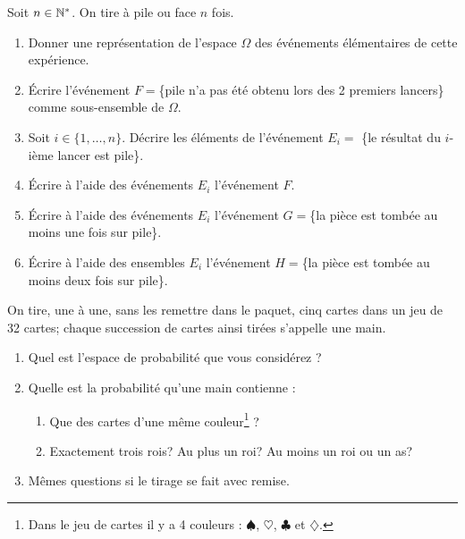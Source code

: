 \documentclass[a4paper,12pt,reqno]{amsart}
\begin{document}
\begin{exo}

    Soit $n\in \mathbb{N}^*$. On tire à pile ou face $n$ fois.

    \begin{enumerate}
      \item Donner une représentation  de l'espace $\Omega$ des événements
      élémentaires de cette expérience.

      \item Écrire l'événement $F=$\{pile n'a pas été obtenu lors
      des 2 premiers lancers\} comme sous-ensemble de $\Omega$.

      \item Soit $i\in \{1,\ldots,n\}$.
      Décrire les éléments de l'événement $E_i=$
      \{le résultat du $i$-ième lancer est pile\}.

      \item Écrire à l'aide des événements $E_i$ l'événement $F$.

      \item Écrire à l'aide des événements $E_i$ l'événement
      $G=$\{la pièce est tombée au moins une fois sur pile\}.

      \item Écrire à l'aide des ensembles $E_i$ l'événement
      $H=$\{la pièce est tombée au moins deux fois sur pile\}.
    \end{enumerate}

\end{exo}


\begin{exo}

  On tire, une à une, sans les remettre dans le paquet, cinq cartes dans un jeu de 32 cartes; chaque succession de cartes  ainsi tirées s'appelle une main.
  \begin{enumerate}
    \item Quel est l'espace de probabilité que vous considérez ?
    \item Quelle est la probabilité qu'une main  contienne :
    \begin{enumerate}
      \item Que des cartes d'une même couleur\footnote{Dans le jeu de cartes il y a 4 couleurs : $\spadesuit$, $\heartsuit$, $\clubsuit$ et $\diamondsuit$.} ?
      \item Exactement trois rois? Au plus un roi? Au moins un roi ou un as?
    \end{enumerate}
    \item Mêmes questions si le tirage se fait avec remise.
  \end{enumerate}
\end{exo}
\end{document}
